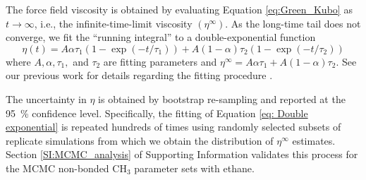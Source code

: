 \documentclass[preprint,review,12pt]{elsarticle}
\begin{document}
	
	
	The force field viscosity is obtained by evaluating Equation \ref{eq:Green_Kubo} as $t \rightarrow \infty$, i.e., the infinite-time-limit viscosity $(\eta^\infty)$. As the long-time tail does not converge, we fit the ``running integral'' to a double-exponential function
	\begin{equation} \label{eq: Double exponential}
	\eta(t) = A \alpha \tau_1 \left(1-\exp{(-t/\tau_1)}\right) + A (1-\alpha) \tau_2 \left(1-\exp{(-t/\tau_2)}\right)
	\end{equation}
	where $A, \alpha, \tau_1, $ and $\tau_2$ are fitting parameters and $\eta^\infty = A \alpha \tau_1 + A (1-\alpha) \tau_2$. See our previous work for details regarding the fitting procedure \cite{Postdoc_3}. 
	
	 
	The uncertainty in $\eta$ is obtained by bootstrap re-sampling and reported at the 95~\% confidence level. Specifically, the fitting of Equation \ref{eq: Double exponential} is repeated hundreds of times using randomly selected subsets of replicate simulations from which we obtain the distribution of $\eta^{\infty}$ estimates. Section \ref{SI:MCMC_analysis} of Supporting Information validates this process for the MCMC non-bonded CH$_3$ parameter sets with ethane. 
		
%	
	
\end{document}
